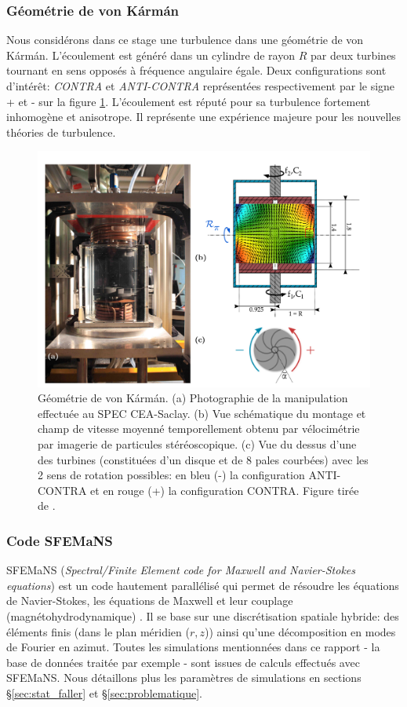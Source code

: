 \documentclass[13pt, a4paper]{extarticle}
\begin{document}
\subsubsection{Géométrie de von Kármán}
\noindent Nous considérons dans ce stage une turbulence dans une géométrie de von Kármán.
L'écoulement est généré dans un cylindre de rayon $R$ par deux turbines tournant
en sens opposés à fréquence angulaire égale. Deux configurations sont d'intérêt: 
\emph{CONTRA} et \emph{ANTI-CONTRA}
représentées respectivement par le signe + et - sur la figure \ref{fig:geo_vk}.
L'écoulement est réputé pour sa turbulence fortement inhomogène et anisotrope.
Il représente une expérience majeure pour les nouvelles théories de turbulence.
\begin{figure}[h]
  \centering
  \includegraphics[width=.9\linewidth]{figs/geometrie_vk.png}
  \caption[Géométrie de von Kármán]
  {Géométrie de von Kármán. 
  (a) Photographie de la manipulation effectuée au SPEC CEA-Saclay. (b) Vue schématique du montage
  et champ de vitesse moyenné temporellement obtenu par vélocimétrie par imagerie de particules stéréoscopique.
  (c) Vue du dessus d'une des turbines (constituées d'un disque et de 8 pales courbées) 
  avec les 2 sens de rotation possibles: en bleu (-) la configuration ANTI-CONTRA 
  et en rouge (+) la configuration CONTRA.
  Figure tirée de \cite{Dubrulle-Beyond}.}
  \label{fig:geo_vk}
\end{figure}

\subsubsection{Code SFEMaNS}
\noindent SFEMaNS (\emph{Spectral/Finite Element code for Maxwell and Navier-Stokes equations})
est un code hautement parallélisé qui permet de résoudre les équations
de Navier-Stokes, les équations de Maxwell et leur couplage (magnétohydrodynamique) \cite{sfemans}.
Il se base sur une discrétisation spatiale hybride: des éléments finis 
(dans le plan méridien ($r,z$)) ainsi qu'une 
décomposition en modes de Fourier en azimut.
Toutes les simulations mentionnées dans ce rapport - la base de données traitée
par exemple - sont issues de calculs effectués avec SFEMaNS. Nous détaillons plus 
les paramètres de
simulations en sections \S \ref{sec:stat_faller} et \S \ref{sec:problematique}.\\
\end{document}
